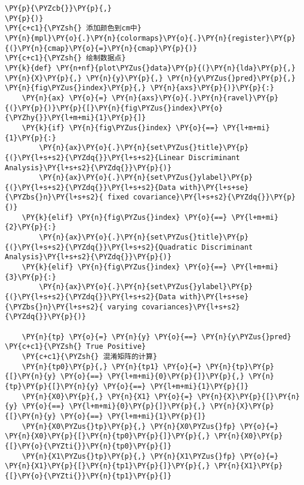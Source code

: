 \begin{Verbatim}[commandchars=\\\{\}]
    \PY{p}{\PYZcb{}}\PY{p}{,}
\PY{p}{)}
\PY{c+c1}{\PYZsh{} 添加颜色到cm中}
\PY{n}{mpl}\PY{o}{.}\PY{n}{colormaps}\PY{o}{.}\PY{n}{register}\PY{p}{(}\PY{n}{cmap}\PY{o}{=}\PY{n}{cmap}\PY{p}{)}
\PY{c+c1}{\PYZsh{} 绘制数据点}
\PY{k}{def} \PY{n+nf}{plot\PYZus{}data}\PY{p}{(}\PY{n}{lda}\PY{p}{,} \PY{n}{X}\PY{p}{,} \PY{n}{y}\PY{p}{,} \PY{n}{y\PYZus{}pred}\PY{p}{,} \PY{n}{fig\PYZus{}index}\PY{p}{,} \PY{n}{axs}\PY{p}{)}\PY{p}{:}
    \PY{n}{ax} \PY{o}{=} \PY{n}{axs}\PY{o}{.}\PY{n}{ravel}\PY{p}{(}\PY{p}{)}\PY{p}{[}\PY{n}{fig\PYZus{}index}\PY{o}{\PYZhy{}}\PY{l+m+mi}{1}\PY{p}{]}
    \PY{k}{if} \PY{n}{fig\PYZus{}index} \PY{o}{==} \PY{l+m+mi}{1}\PY{p}{:}
        \PY{n}{ax}\PY{o}{.}\PY{n}{set\PYZus{}title}\PY{p}{(}\PY{l+s+s2}{\PYZdq{}}\PY{l+s+s2}{Linear Discriminant Analysis}\PY{l+s+s2}{\PYZdq{}}\PY{p}{)}
        \PY{n}{ax}\PY{o}{.}\PY{n}{set\PYZus{}ylabel}\PY{p}{(}\PY{l+s+s2}{\PYZdq{}}\PY{l+s+s2}{Data with}\PY{l+s+se}{\PYZbs{}n}\PY{l+s+s2}{ fixed covariance}\PY{l+s+s2}{\PYZdq{}}\PY{p}{)}
    \PY{k}{elif} \PY{n}{fig\PYZus{}index} \PY{o}{==} \PY{l+m+mi}{2}\PY{p}{:}
        \PY{n}{ax}\PY{o}{.}\PY{n}{set\PYZus{}title}\PY{p}{(}\PY{l+s+s2}{\PYZdq{}}\PY{l+s+s2}{Quadratic Discriminant Analysis}\PY{l+s+s2}{\PYZdq{}}\PY{p}{)}
    \PY{k}{elif} \PY{n}{fig\PYZus{}index} \PY{o}{==} \PY{l+m+mi}{3}\PY{p}{:}
        \PY{n}{ax}\PY{o}{.}\PY{n}{set\PYZus{}ylabel}\PY{p}{(}\PY{l+s+s2}{\PYZdq{}}\PY{l+s+s2}{Data with}\PY{l+s+se}{\PYZbs{}n}\PY{l+s+s2}{ varying covariances}\PY{l+s+s2}{\PYZdq{}}\PY{p}{)}

    \PY{n}{tp} \PY{o}{=} \PY{n}{y} \PY{o}{==} \PY{n}{y\PYZus{}pred}  \PY{c+c1}{\PYZsh{} True Positive}
    \PY{c+c1}{\PYZsh{} 混淆矩阵的计算}
    \PY{n}{tp0}\PY{p}{,} \PY{n}{tp1} \PY{o}{=} \PY{n}{tp}\PY{p}{[}\PY{n}{y} \PY{o}{==} \PY{l+m+mi}{0}\PY{p}{]}\PY{p}{,} \PY{n}{tp}\PY{p}{[}\PY{n}{y} \PY{o}{==} \PY{l+m+mi}{1}\PY{p}{]}
    \PY{n}{X0}\PY{p}{,} \PY{n}{X1} \PY{o}{=} \PY{n}{X}\PY{p}{[}\PY{n}{y} \PY{o}{==} \PY{l+m+mi}{0}\PY{p}{]}\PY{p}{,} \PY{n}{X}\PY{p}{[}\PY{n}{y} \PY{o}{==} \PY{l+m+mi}{1}\PY{p}{]}
    \PY{n}{X0\PYZus{}tp}\PY{p}{,} \PY{n}{X0\PYZus{}fp} \PY{o}{=} \PY{n}{X0}\PY{p}{[}\PY{n}{tp0}\PY{p}{]}\PY{p}{,} \PY{n}{X0}\PY{p}{[}\PY{o}{\PYZti{}}\PY{n}{tp0}\PY{p}{]}
    \PY{n}{X1\PYZus{}tp}\PY{p}{,} \PY{n}{X1\PYZus{}fp} \PY{o}{=} \PY{n}{X1}\PY{p}{[}\PY{n}{tp1}\PY{p}{]}\PY{p}{,} \PY{n}{X1}\PY{p}{[}\PY{o}{\PYZti{}}\PY{n}{tp1}\PY{p}{]}


\end{Verbatim}
